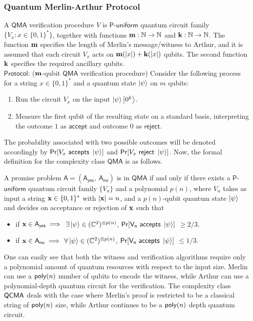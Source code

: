 \documentclass[11pt]{article}
\begin{document}
\subsubsection{Quantum Merlin-Arthur Protocol}\label{subsec:qma-protocol}
A $\mathsf{QMA}$ verification procedure $V$ is $\mathsf{P}$-$\mathsf{uniform}$ quantum circuit family $\{V_x:x\in \{0,1\}^*\}$, together with functions $\mathbf{m}:\mathbb{N}\rightarrow\mathbb{N}$ and $\mathbf{k}:\mathbb{N}\rightarrow\mathbb{N}$. The function $\mathbf{m}$ specifies the length of Merlin's message/witness to Arthur, and it is assumed that each circuit $V_x$ acts on $\mathbf{m}(|x|)+\mathbf{k}(|x|)$ qubits. The second function $\mathbf{k}$ specifies the required ancillary qubits.\newline
\\
$\mathsf{Protocol}$: ($\mathbf{m}$-qubit $\mathsf{QMA}$ verification procedure) Consider the following process for a string $x\in \{0,1\}^*$ and a quantum state $\ket{\psi}$ on $m$ qubits:
\begin{enumerate}
    \item Run the circuit $V_x$ on the input $\ket{\psi}\ket{0^k}$.
    \item Measure the first qubit of the resulting state on a standard basis, interpreting the outcome $1$ as $\mathsf{accept}$ and outcome $0$ as $\mathsf{reject}$.
\end{enumerate}
The probability associated with two possible outcomes will be denoted accordingly by $\mathsf{Pr}[V_x\ \mathsf{accepts}\ \ket{\psi}]$ and $\mathsf{Pr}[V_x\ \mathsf{reject}\ \ket{\psi}]$. Now, the formal definition for the complexity class $\mathsf{QMA}$ is as follows.

\begin{definition}
     A promise problem $\mathsf{A=(A_{yes},\ A_{no})}$ is in $\mathsf{QMA}$ if and only if there exists a $\mathsf{P}$-$\mathsf{uniform}$ quantum circuit family $\{V_n\}$ and a polynomial $p(n)$, where $V_n$ takes as input a string $\mathbf{x}\in \{0,1\}^*$ with $|\mathbf{x}|=n$, and a $p(n)$-qubit quantum state $\ket{\psi}$ and decides on acceptance or rejection of $\mathbf{x}$ such that 
    \begin{itemize}
        \item if $\mathbf{x}\in \mathsf{A_{yes}} \implies$ $\exists\ket{\psi}\in (\mathbb{C}^2)^{\otimes p(n)}$, $\mathsf{Pr[V_n\ accepts\ \ket{\psi}]}$ $\geq 2/3$.
        \item if $\mathbf{x}\in \mathsf{A_{no}} \implies $ $\forall \ket{\psi}\in (\mathbb{C}^2)^{\otimes p(n)}$, $\mathsf{Pr[V_n\ accepts\ \ket{\psi}]}$ $\leq 1/3$.
    \end{itemize}
\end{definition}
One can easily see that both the witness and verification algorithms require only a polynomial amount of quantum resources with respect to the input size. Merlin can use a $\mathsf{poly}(n)$ number of qubits to encode the witness, while Arthur can use a polynomial-depth quantum circuit for the verification. The complexity class $\mathsf{QCMA}$ deals with the case where Merlin's proof is restricted to be a classical string of $\mathsf{poly}(n)$ size, while Arthur continues to be a $\mathsf{poly}(n)$ depth quantum circuit.
\end{document}
